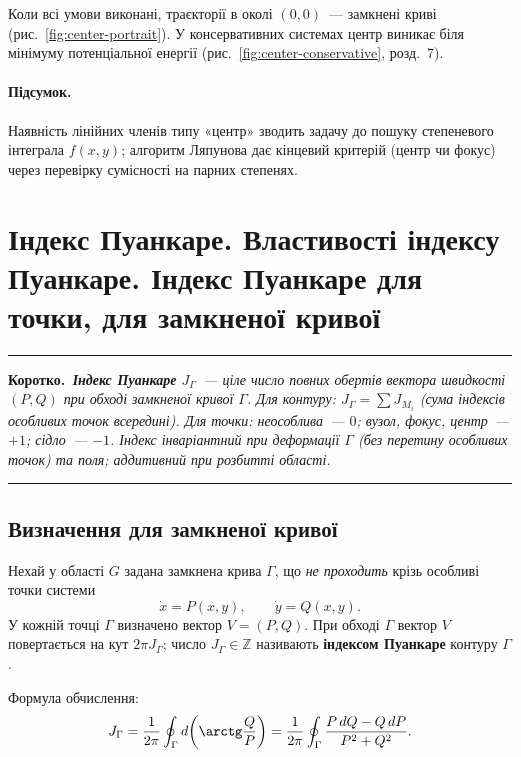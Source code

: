 \documentclass[12pt,a4paper]{article}
\theoremstyle{definition}
\theoremstyle{plain}
\newenvironment{korotko}
  {\par\medskip\noindent\begingroup\color{accent!75!black}\rule{\linewidth}{0.4pt}\par
   \noindent\textbf{Коротко.}\itshape\,}
  {\par\noindent\rule{\linewidth}{0.4pt}\endgroup\medskip}
\begin{document}
Коли всі умови виконані, траєкторії в околі $(0,0)$~--- замкнені криві
(рис.~\ref{fig:center-portrait}). У консервативних системах центр виникає
біля мінімуму потенціальної енергії (рис.~\ref{fig:center-conservative},
розд.~7).

\paragraph{Підсумок.} Наявність лінійних членів типу «центр» зводить задачу до
пошуку степеневого інтеграла $f(x,y)$; алгоритм Ляпунова дає кінцевий
критерій (центр чи фокус) через перевірку сумісності на парних степенях.

\newpage
\section{Індекс Пуанкаре. Властивості індексу Пуанкаре. Індекс Пуанкаре для точки, для замкненої кривої}


\begin{korotko}
\textbf{Індекс Пуанкаре} $J_\Gamma$~--- ціле число повних обертів вектора
швидкості $(P,Q)$ при обході замкненої кривої $\Gamma$. Для контуру:
$J_\Gamma=\sum J_{M_i}$ (сума індексів особливих точок всередині). Для точки:
неособлива~--- $0$; вузол, фокус, центр~--- $+1$; сідло~--- $-1$. Індекс
інваріантний при деформації $\Gamma$ (без перетину особливих точок) та поля;
аддитивний при розбитті області.
\end{korotko}

\subsection{Визначення для замкненої кривої}

Нехай у області $G$ задана замкнена крива $\Gamma$, що \emph{не проходить}
крізь особливі точки системи
\begin{equation}
  \dot x = P(x,y), \qquad \dot y = Q(x,y).
\end{equation}
У кожній точці $\Gamma$ визначено вектор $V=(P,Q)$. При обході $\Gamma$
вектор $V$ повертається на кут $2\pi J_\Gamma$; число $J_\Gamma\in\mathbb{Z}$
називають \textbf{індексом Пуанкаре} контуру $\Gamma$.

Формула обчислення:
\begin{equation}
  J_\Gamma = \frac{1}{2\pi}\oint_\Gamma d\!\left(\arctg\frac{Q}{P}\right)
  = \frac{1}{2\pi}\oint_\Gamma \frac{P\,dQ - Q\,dP}{P^2+Q^2}.
  \label{eq:poincare-index}
\end{equation}
\end{document}
